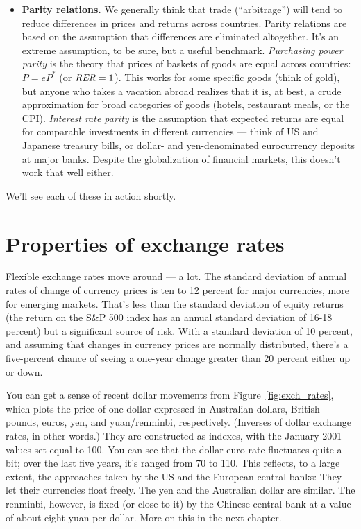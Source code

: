\begin{itemize}
\item \textbf{Parity relations.}
We generally think that trade (``arbitrage'')
will tend to reduce differences in prices and returns across countries.
Parity relations are based on the assumption that differences are
eliminated altogether.  It's an extreme assumption, to be sure,
but a useful benchmark.
{\it Purchasing power parity\/} is the theory that prices of baskets of goods are equal across countries:  $P = e P^* $
(or $\mbox{\it RER\/} = 1$).
This works for some specific goods (think of gold),
but anyone who takes a vacation abroad realizes that it is,
at best, a crude approximation for
broad categories of goods (hotels, restaurant meals, or the CPI).
{\it Interest rate parity\/} is the assumption that expected returns are equal
for comparable investments in different currencies --- think of US and Japanese treasury bills, or dollar- and yen-denominated eurocurrency deposits at major banks.
Despite the globalization of financial markets,
this doesn't work that well either.

\end{itemize}
%
We'll see each of these in action shortly.


\section{Properties of exchange rates}

Flexible exchange rates move around --- a lot.
The standard deviation of annual rates of change of currency prices
is ten to 12 percent for major currencies, more for emerging markets.
That's less than the standard deviation of equity returns
(the return on the S\&P 500 index has an annual standard deviation of 16-18 percent)
but a significant source of risk.
With a standard deviation of 10 percent, and assuming that changes in currency prices are normally distributed,
there's a five-percent chance of seeing a one-year change greater than 20 percent
either up or down.


You can get a sense of recent dollar movements from
Figure~\ref{fig:exch_rates},
which plots the price of one dollar expressed in Australian dollars,
British pounds, euros, yen, and yuan/renminbi, respectively.
(Inverses of dollar exchange rates, in other words.)
They are constructed as indexes, with the January 2001 values
set equal to 100.
You can see that the dollar-euro rate fluctuates quite a bit;
over the last five years, it's ranged from 70 to 110.
This reflects, to a large extent, the approaches taken by
the US and the European central banks:
They let their currencies float freely.
The yen and the Australian dollar
are similar.
The renminbi, however, is fixed (or close to it)
by the Chinese central bank at a value of about eight yuan per dollar.
More on this in the next chapter.

